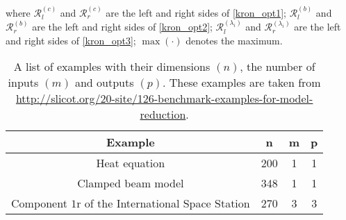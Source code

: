 \documentclass[a4paper,11pt, twoside]{article}
\begin{document}
where $\mathcal R^{(c)}_{l}$ and $\mathcal R^{(c)}_{r}$ are the left and right sides of \eqref{kron_opt1}; $\mathcal R^{(b)}_{l}$ and $\mathcal 
R^{(b)}_{r}$ are the left and right sides of \eqref{kron_opt2}; $\mathcal R^{(\lambda_i)}_{l}$ and $\mathcal R^{(\lambda_i)}_{r}$ are the left and 
right sides of \eqref{kron_opt3};  $\max(\cdot)$ denotes the maximum. 
\begin{table}[tb!]
	\centering
	\begin{tabular}{|c|c|c|c|}
\hline
Example & n  & m & p\\
\hline
Heat equation & 200 & 1& 1\\
\hline 
Clamped beam model & 348 & 1& 1\\
\hline
Component $1$r of the International Space Station & 270 & 3&3\\
\hline
	\end{tabular}
\caption{A list of examples with their dimensions $(n)$, the number of inputs $(m)$ and outputs $(p)$. These examples are taken from 
\url{http://slicot.org/20-site/126-benchmark-examples-for-model-reduction}.}
\label{tab:list_examples}
\end{table}
\end{document}
